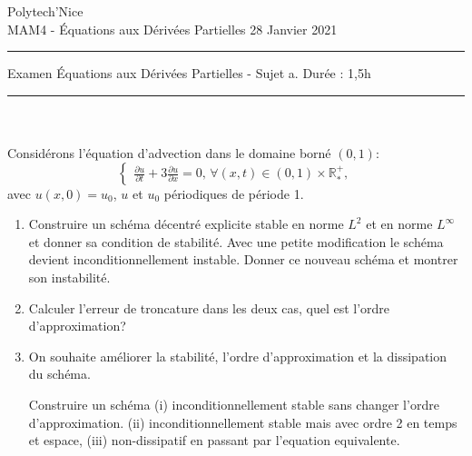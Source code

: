 \documentclass[12pt,a4paper]{article}
\begin{document}
 \hfill Polytech'Nice\\
\noindent MAM4 - \'Equations aux D\'eriv\'ees Partielles \hfill 
28 Janvier 2021 \\

\hrule

\vspace{0.6cm}
\centerline {\large \sc Examen \'Equations aux D\'eriv\'ees Partielles - Sujet a. Dur\'ee : 1,5h}
\vspace{0.6cm}


\hrule
\vspace{0.7cm}
\\

\\%
\noindent Consid\'erons l'\'equation d'advection dans le domaine born\'e $(0,1)$:
$$
\begin{cases}
\displaystyle\frac{\partial u}{\partial t}+3\frac{\partial u}{\partial
  x}=0,\, \forall (x,t)\in(0,1)\times\mathbb{R}^+_*,
\end{cases}
$$
avec $u(x, 0) = u_0$, $u$ et $u_0$ p\'eriodiques de p\'eriode 1.
\begin{enumerate}
\item Construire un schéma décentré explicite stable en norme $L^2$ et en norme $L^{\infty}$ et donner sa condition de stabilité. Avec une petite modification le schéma devient inconditionnellement instable. Donner ce nouveau schéma et montrer son instabilité. 

\item Calculer l'erreur de troncature dans les deux cas, quel est l'ordre d'approximation?

\item  On souhaite améliorer la stabilité, l'ordre d'approximation et la dissipation du schéma.

Construire un schéma (i) inconditionnellement stable sans changer l'ordre d'approximation. (ii) inconditionnellement stable mais avec ordre 2 en temps et espace, (iii) non-dissipatif en passant par l'equation equivalente.


\end{enumerate}
\end{document}
